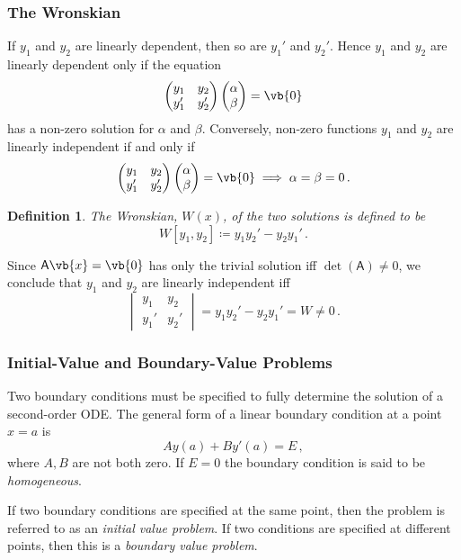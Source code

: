 \documentclass{article}
\theoremstyle{plain}\theoremheaderfont{\normalfont\itshape}\theorembodyfont{\rmfamily}\theoremseparator{.}\newtheorem*{rem}{Remark}\newtheorem*{ex}{Example}\newtheorem*{proof}{Proof}\newtheorem*{altp}{Alternative proof}
\theoremstyle{plain}\theoremheaderfont{\normalfont\bfseries}\theorembodyfont{\rmfamily}\theoremseparator{.}\newtheorem{thm}{Theorem}[section]\newtheorem{lem}[thm]{Lemma}\newtheorem{prop}[thm]{Proposition}\newtheorem*{cor}{Corollary}\newtheorem{defn}[thm]{Definition}\newtheorem{clm}[thm]{Claim}\newtheorem{clminproof}{Claim}
\theoremstyle{break}\theoremheaderfont{\normalfont\itshape}\theorembodyfont{\rmfamily}\theoremseparator{.\medskip}\newtheorem*{proofskip}{Proof}\newtheorem*{exs}{Examples}\newtheorem*{rems}{Remarks}
\theoremstyle{break}\theoremheaderfont{\normalfont\bfseries}\theorembodyfont{\rmfamily}\theoremseparator{.\medskip}\newtheorem{lemskip}[thm]{Lemma}\newtheorem{defnskip}[thm]{Definition}\newtheorem{propskip}[thm]{Proposition}\newtheorem{thmskip}[thm]{Theorem}
\numberwithin{equation}{section}
\begin{document}
	\subsubsection{The Wronskian}
	If \(y_1\) and \(y_2\) are linearly dependent, then so are \(y_1'\) and \(y_2'\). Hence \(y_1\) and \(y_2\) are linearly dependent only if the equation
	\[\begin{pmatrix}
		y_1 & y_2\\
		y_1' & y_2'
	\end{pmatrix}
	\begin{pmatrix}
		\alpha\\
		\beta
	\end{pmatrix}=\vb{0}\]
	has a non-zero solution for \(\alpha\) and \(\beta\). Conversely, non-zero functions \(y_1\) and \(y_2\) are linearly independent if and only if
	\[\begin{pmatrix}
		y_1 & y_2\\
		y_1' & y_2'
	\end{pmatrix}
	\begin{pmatrix}
		\alpha\\
		\beta
	\end{pmatrix}=\vb{0}\implies\alpha=\beta=0\,.\]
	
	\begin{defn}
		The \textit{Wronskian}, \(W(x)\), of the two solutions is defined to be
		\[W[y_1,y_2]\coloneqq y_1y_2'-y_2y_1'\,.\]
	\end{defn}
	Since \(\mathsf{A}\vb{x}=\vb{0}\) has only the trivial solution iff \(\det(\mathsf{A})\ne 0\), we conclude that \(y_1\) and \(y_2\) are linearly independent iff
	\[\begin{vmatrix}
		y_1 & y_2\\
		y_1' & y_2'
	\end{vmatrix}=y_1y_2'-y_2y_1'=W\ne0\,.\]
	
	\subsubsection{Initial-Value and Boundary-Value Problems}
	Two boundary conditions must be specified to fully determine the solution of a second-order ODE. The general form of a linear boundary condition at a point \(x=a\) is
	\[Ay(a)+By'(a)=E\,,\]
	where \(A, B\) are not both zero. If \(E=0\) the boundary condition is said to be \textit{homogeneous}.

	If two boundary conditions are specified at the same point, then the problem is referred to as an \textit{initial value problem}. If two conditions are specified at different points, then this is a \textit{boundary value problem}.
	
\end{document}
